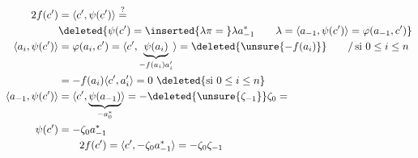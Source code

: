 \[
\begin{aligned}
2f(c')&=\langle c',\psi(c')\rangle\overset{?}{=}\\
&\deleted{\psi(c')=\inserted{\lambda\pi={}}\lambda a_{-1}^*\qquad\lambda=\langle a_{-1},\psi(c')\rangle=\varphi(a_{-1},c')}\\
\langle a_i,\psi(c')\rangle&=\varphi(a_i,c')=\langle c',\underbrace{\psi(a_i)}_{-f(a_i)a'_i}\rangle
=\deleted{\unsure{-f(a_i)}}\qquad/\,\text{si }0\le i\le n\\
&=-f(a_i)\langle c',a'_i\rangle=0\ \deleted{\text{si }0\le i\le n}\\
\langle a_{-1},\psi(c')\rangle&=\langle c',\underbrace{\psi(a_{-1})}_{-a_0^*}\rangle=-\deleted{\unsure{\zeta_{-1}}}\zeta_0=\\
\psi(c')&=-\zeta_0 a_{-1}^*\\
&\qquad 2f(c')=\langle c',-\zeta_0a_{-1}^*\rangle=-\zeta_0\zeta_{-1}
\end{aligned}
\]
